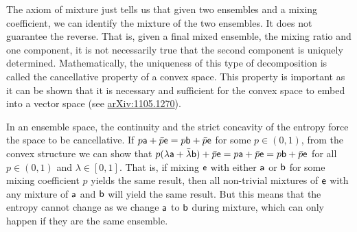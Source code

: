 The axiom of mixture just tells us that given two ensembles and a mixing coefficient, we can identify the mixture of the two ensembles. It does not guarantee the reverse. That is, given a final mixed ensemble, the mixing ratio and one component, it is not necessarily true that the second component is uniquely determined. Mathematically, the uniqueness of this type of decomposition is called the cancellative property of a convex space. This property is important as it can be shown that it is necessary and sufficient for the convex space to embed into a vector space (see \href{https://arxiv.org/abs/1105.1270}{arXiv:1105.1270}).

In an ensemble space, the continuity and the strict concavity of the entropy force the space to be cancellative. If $p \ens[a] + \bar{p} \ens = p \ens[b] + \bar{p} \ens$ for some $p \in (0,1)$, from the convex structure we can show that $p(\lambda\ens[a] + \bar{\lambda}\ens[b]) + \bar{p} \ens = p\ens[a] + \bar{p} \ens = p \ens[b] + \bar{p} \ens$ for all $p \in (0,1)$ and $\lambda \in [0,1]$. That is, if mixing $\ens$ with either $\ens[a]$ or $\ens[b]$ for some mixing coefficient $p$ yields the same result, then all non-trivial mixtures of $\ens$ with any mixture of $\ens[a]$ and $\ens[b]$ will yield the same result. But this means that the entropy cannot change as we change $\ens[a]$ to $\ens[b]$ during mixture, which can only happen if they are the same ensemble.

